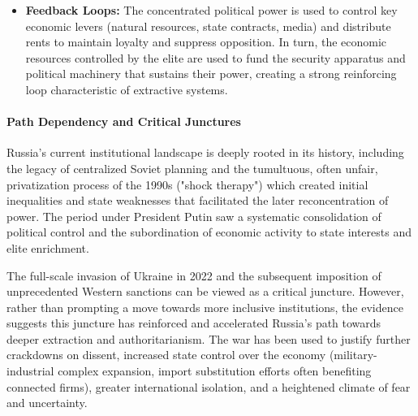 \begin{itemize}
\begin{itemize}
              Furthermore, systemic corruption acts as a massive operational tax, an assertion corroborated by the \textcite{transparency2025cpi}, which ranks Russia among the most highly corrupt nations globally. These features align perfectly with extractive economic institutions designed to channel resources toward a ruling elite.
          \end{itemize}
          These features align closely with extractive economic institutions designed to channel resources towards the ruling elite and their networks.
    \item \textbf{Feedback Loops:} The concentrated political power is used to control key economic levers (natural resources, state contracts, media) and distribute rents to maintain loyalty and suppress opposition. In turn, the economic resources controlled by the elite are used to fund the security apparatus and political machinery that sustains their power, creating a strong reinforcing loop characteristic of extractive systems.
\end{itemize}

\paragraph{Path Dependency and Critical Junctures}
Russia's current institutional landscape is deeply rooted in its history, including the legacy of centralized Soviet planning and the tumultuous, often unfair, privatization process of the 1990s ("shock therapy") which created initial inequalities and state weaknesses that facilitated the later reconcentration of power. The period under President Putin saw a systematic consolidation of political control and the subordination of economic activity to state interests and elite enrichment.

The full-scale invasion of Ukraine in 2022 and the subsequent imposition of unprecedented Western sanctions can be viewed as a critical juncture. However, rather than prompting a move towards more inclusive institutions, the evidence suggests this juncture has reinforced and accelerated Russia's path towards deeper extraction and authoritarianism. The war has been used to justify further crackdowns on dissent, increased state control over the economy (military-industrial complex expansion, import substitution efforts often benefiting connected firms), greater international isolation, and a heightened climate of fear and uncertainty.

